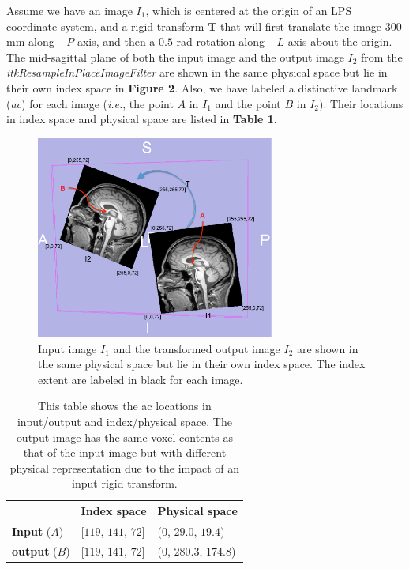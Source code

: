 \documentclass{InsightArticle}
\begin{document}
Assume we have an image $I_1$, which is centered at the origin of an LPS coordinate system, and a rigid transform $\mathbf{T}$ that will first translate the image $300$ mm along $-P$-axis, and then a $0.5$ rad rotation along $-L$-axis about the origin. The mid-sagittal plane of both the input image and the output image $I_2$ from the \textit{itkResampleInPlaceImageFilter} are shown in the same physical space but lie in their own index space in \textbf{Figure 2}. Also, we have labeled a distinctive landmark (\textit{ac}) for each image (\textit{i.e.}, the point $A$ in $I_1$ and the point $B$ in $I_2$). Their locations in index space and physical space are listed in \textbf{Table 1}.
\begin{figure}[htp]
	\begin{center}
		\includegraphics[width=0.7\textwidth]{itkResampleInPlaceImageFilter-Demo}
		\caption{Input image $I_1$ and the transformed output image $I_2$ are shown in the same physical space but lie in their own index space. The index extent are labeled in black for each image.}
	\end{center}
\end{figure}
\begin{table}[htbp]
\begin{center}
\begin{tabular}{ | p{3cm} | p{3cm} | p{3cm} | }
\hline
 & \textbf{Index space} & \textbf{Physical space} \\ \hline
\textbf{Input} ($A$) & [$119$, $141$, $72$] & ($0$, $29.0$, $19.4$) \\ \hline
\textbf{output} ($B$) & [$119$, $141$, $72$] & ($0$, $280.3$, $174.8$) \\ \hline
\end{tabular}
\end{center}
\caption{This table shows the ac locations in input/output and index/physical space. The output image has the same voxel contents as that of the input image but with different physical representation due to the impact of an input rigid transform.}
\end{table}
\end{document}
